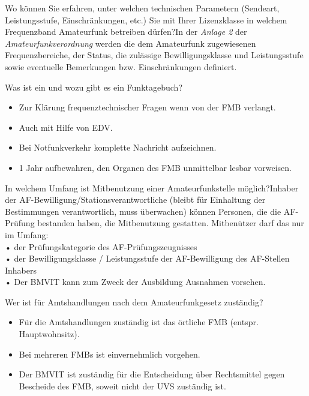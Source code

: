 \documentclass[avery5371,grid,frame,a4paper]{flashcards}
\newcommand{\card}[3]{
  \begin{flashcard}[{\chap} -- #1]{#2}#3\end{flashcard}
}
\begin{document}
\card{33}{Wo können Sie erfahren, unter welchen technischen Parametern (Sendeart, Leistungsstufe, Einschränkungen, etc.) Sie mit Ihrer Lizenzklasse in welchem Frequenzband Amateurfunk betreiben dürfen?}{In der \emph{Anlage 2} der \emph{Amateurfunkverordnung} werden die dem Amateurfunk zugewiesenen Frequenzbereiche, der Status, die zulässige Bewilligungsklasse und Leistungsstufe sowie eventuelle Bemerkungen bzw. Einschränkungen definiert.}

\card{34}{Was ist ein und wozu gibt es ein Funktagebuch?}{\begin{itemize}\itemsep0pt \item Zur Klärung frequenztechnischer Fragen wenn von der FMB verlangt. \item Auch mit Hilfe von EDV. \item Bei Notfunkverkehr komplette Nachricht aufzeichnen. \item 1 Jahr aufbewahren, den Organen des FMB unmittelbar lesbar vorweisen. \end{itemize}}

\card{35}{In welchem Umfang ist Mitbenutzung einer Amateurfunkstelle möglich?}{Inhaber der AF-Bewilligung/Stationsverantwortliche (bleibt für Einhaltung der Bestimmungen verantwortlich, muss überwachen) können Personen, die die AF-Prüfung bestanden haben, die Mitbenutzung gestatten. Mitbenützer darf das nur im Umfang: \\ • der Prüfungskategorie des AF-Prüfungszeugnisses \\ • der Bewilligungsklasse / Leistungsstufe der AF-Bewilligung des AF-Stellen Inhabers \\ • Der BMVIT kann zum Zweck der Ausbildung Ausnahmen vorsehen.}

\card{36}{Wer ist für Amtshandlungen nach dem Amateurfunkgesetz zuständig?}{\begin{itemize}\itemsep1pt \item Für die Amtshandlungen zuständig ist das örtliche FMB (entspr. Hauptwohnsitz). \item Bei mehreren FMBs ist einvernehmlich vorgehen. \item Der BMVIT ist zuständig für die Entscheidung über Rechtsmittel gegen Bescheide des FMB, soweit nicht der UVS zuständig ist.\end{itemize}}
\end{document}

